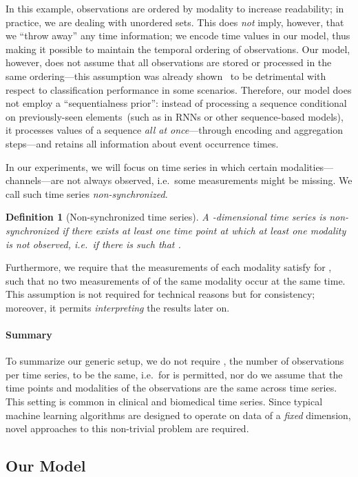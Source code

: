 \documentclass{article}
\newtheorem{definition}{Definition}
\begin{document}
In this example, observations are ordered by modality to increase
readability; in practice, we are dealing with unordered sets.
This does \emph{not} imply, however, that we ``throw away'' any time
information; we encode time values in our model, thus making it possible
to maintain the temporal ordering of observations. Our model, however,
does not assume that all observations are stored or processed in the
same ordering---this assumption was already
shown~\citep{vinyals2015order} to be detrimental with respect to
classification performance in some scenarios.
Therefore, our model does not employ a ``sequentialness prior'':
instead of processing a sequence conditional on previously-seen
elements~(such as in RNNs or other sequence-based models), it
processes values of a sequence \emph{all at once}---through encoding and
aggregation steps---and retains all information about event occurrence
times.

In our experiments, we will focus on time series in which certain
modalities---channels---are not always observed, i.e.\ some
measurements might be missing. We call such time series
\emph{non-synchronized}.
\begin{definition}[Non-synchronized time series]
  A \mbox{-dimensional} time series is \emph{non-synchronized} if there
  exists at least one time point  at which at least one
  modality is not observed, i.e.\ if there is 
  such that .
\end{definition}
Furthermore, we require that the measurements of each modality satisfy
 for , such that no two measurements of of the
same modality occur at the same time.  This assumption is not required
for technical reasons but for consistency; moreover, it permits
\emph{interpreting} the results later on. 

\paragraph{Summary} To summarize our generic setup, we do not require
, the number of observations per time series, to be the same, i.e.\
 for  is
permitted, nor do we assume that the time points and modalities of the
observations are the same across time series.
This setting is common in clinical and biomedical time series. Since
typical machine learning algorithms are designed to operate on data of
a \emph{fixed} dimension, novel approaches to this non-trivial problem
are required.

\subsection{Our Model}
\end{document}
